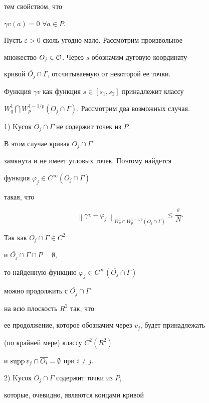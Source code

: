 тем свойством, что


$\gamma v(a) = 0$ $\forall a \in P$.


Пусть $\varepsilon > 0$ сколь угодно мало. Рассмотрим произвольное


множество $O_j \in {\cal O}$. Через $s$ обозначим дуговую координату


кривой $\overline{O_j} \cap \Gamma$, отсчитываемую от некоторой ее точки.


Функция $\gamma v$ как функция $s \in [s_1,s_2]$ принадлежит классу


$W_q^1\bigcap W_p^{1-1/p}(O_j\cap\Gamma)$. Рассмотрим два возможных случая.





1) Kусок $\overline{O_j} \cap \Gamma$ не содержит точек из $P$.


В этом случае кривая $\overline{O_j} \cap \Gamma$ 


замкнута и не имеет угловых точек. Поэтому найдется 


функция $\varphi _j \in C^\infty(\overline{O_j} \cap \Gamma)$


такая, что


$$


{\left\| {\gamma v-\varphi _j}


\right\|}_{W_q^1\cap W_p^{1-1/p}(O_j\cap\Gamma)}


\le \frac{\varepsilon }{N}.


$$


Так как $\overline{O_j} \cap \Gamma \in C^2$


и $\overline{O_j} \cap \Gamma \cap P = \emptyset$,


то найденную функцию $\varphi _j \in C^\infty(\overline{O_j} \cap \Gamma)$


можно продолжить с $\overline{O_j} \cap \Gamma$


на всю плоскость $R^2$ так, что


ее продолжение, которое обозначим через $v_j$, будет принадлежать


(по крайней мере) классу $C^2(R^2)$


и $\operatorname{supp} v_j \cap \overline{O_i}=\emptyset$ при $i \ne j$.





2) Kусок $\overline{O_j} \cap \Gamma$ содержит точки из $P$,


которые, очевидно, являются концами кривой\linebreak


